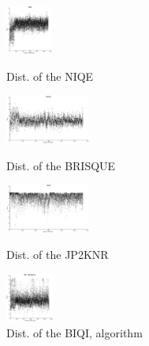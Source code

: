 \begin{figure}
\begin{minipage}{0.48\linewidth}
		\label{fig:gsuf}
	\end{minipage}
	\begin{minipage}{0.48\linewidth}
		\centering
		\includegraphics[width=0.9\linewidth, height=1.6cm]{pics/biqa_dist_niqe}
		\caption{Dist. of the NIQE \cite{niqe}}
		\label{fig:niqe}
	\end{minipage}
	\hfill
	\begin{minipage}{0.48\linewidth}
		\centering
		\includegraphics[width=0.9\linewidth, height=1.6cm]{pics/biqa_dist_brisque}
		\caption{Dist. of the BRISQUE \cite{brisque}}
		\label{fig:brisque}
	\end{minipage}
	\begin{minipage}{0.48\linewidth}
		\centering
		\includegraphics[width=0.9\linewidth, height=1.6cm]{pics/biqa_dist_jp2knr}
		\caption{Dist. of the JP2KNR \cite{jp2knr}}
		\label{fig:jp2knr}
	\end{minipage}
	\hfill
	\begin{minipage}{0.48\linewidth}
		\centering
		\includegraphics[width=0.9\linewidth, height=1.6cm]{pics/biqa_dist_biqi_alg}
		\caption{Dist. of the BIQI, algorithm \cite{biqi}}
		\label{fig:biqialg}
	\end{minipage}
\end{figure}
